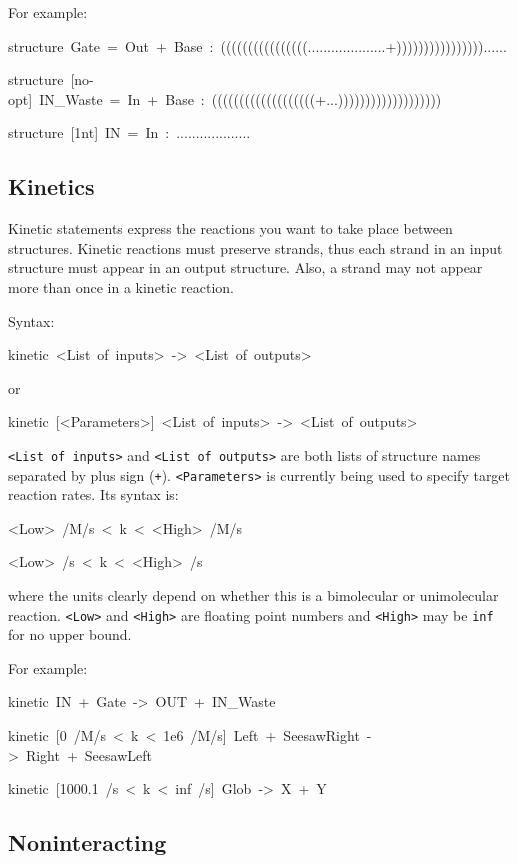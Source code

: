 \documentclass{article}
\newenvironment{code}
{\par\begin{list}{}{
\setlength{\rightmargin}{\leftmargin}
\setlength{\listparindent}{0pt}
\raggedright
\setlength{\itemsep}{0pt}
\setlength{\parsep}{0pt}
\normalfont\ttfamily}
 \item[]}
{\end{list}}
\begin{document}
For example:
\begin{code}
structure~Gate~=~Out~+~Base~:~((((((((((((((((....................+))))))))))))))))......

structure~{[}no-opt{]}~IN\_Waste~=~In~+~Base~:~(((((((((((((((((((+...)))))))))))))))))))

structure~{[}1nt{]}~IN~=~In~:~...................
\end{code}

\subsection{Kinetics}

Kinetic statements express the reactions you want to take place between
structures. Kinetic reactions must preserve strands, thus each strand
in an input structure must appear in an output structure. Also, a
strand may not appear more than once in a kinetic reaction.

Syntax:
\begin{code}
kinetic~<List~of~inputs>~->~<List~of~outputs>
\end{code}
or
\begin{code}
kinetic~{[}<Parameters>{]}~<List~of~inputs>~->~<List~of~outputs>
\end{code}
\texttt{<List of inputs>} and \texttt{<List of outputs>} are both lists of structure
names separated by plus sign (\texttt{+}). \texttt{<Parameters>} is currently being
used to specify target reaction rates. Its syntax is:
\begin{code}
<Low>~/M/s~<~k~<~<High>~/M/s

<Low>~/s~<~k~<~<High>~/s
\end{code}
where the units clearly depend on whether this is a bimolecular or
unimolecular reaction. \texttt{<Low>} and \texttt{<High>} are floating point numbers
and \texttt{<High>} may be \texttt{inf} for no upper bound.

For example:
\begin{code}
kinetic~IN~+~Gate~->~OUT~+~IN\_Waste

kinetic~{[}0~/M/s~<~k~<~1e6~/M/s{]}~Left~+~SeesawRight~->~Right~+~SeesawLeft

kinetic~{[}1000.1~/s~<~k~<~inf~/s{]}~Glob~->~X~+~Y
\end{code}

\subsection{Noninteracting}
\end{document}
